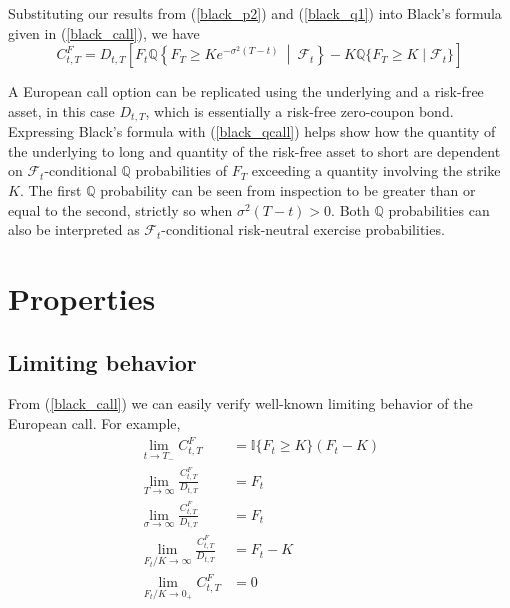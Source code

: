 \documentclass{article}
\numberwithin{equation}{section}
\begin{document}
Substituting our results from (\ref{black_p2}) and (\ref{black_q1}) into Black's
formula given in (\ref{black_call}), we have
\begin{equation} \label{black_qcall}
    C_{t, T}^F = D_{t, T}\left[F_t\mathbb{Q}\left\{F_T \ge Ke^{-\sigma^2(T - t)}
    \ \middle\vert \ \mathcal{F}_t\right\} -
    K\mathbb{Q}\{F_T \ge K \mid \mathcal{F}_t\}\right]
\end{equation}

A European call option can be replicated using the underlying and a risk-free
asset, in this case $ D_{t, T} $, which is essentially a
risk-free zero-coupon bond. Expressing Black's formula with (\ref{black_qcall})
helps show how the quantity of the underlying to long and quantity of the
risk-free asset to short are dependent on $ \mathcal{F}_t $-conditional
$ \mathbb{Q} $ probabilities of $ F_T $ exceeding a quantity involving the
strike $ K $. The first $ \mathbb{Q} $ probability can be seen from inspection
to be greater than or equal to the second, strictly so when
$ \sigma^2(T - t) > 0 $. Both $ \mathbb{Q} $ probabilities can also be
interpreted as $ \mathcal{F}_t $-conditional risk-neutral exercise
probabilities.

\section{Properties}

\subsection{Limiting behavior}

From (\ref{black_call}) we can easily verify well-known limiting behavior of
the European call. For example\footnotemark{},
\begin{equation} \label{black_limits}
    \begin{split}
        \lim_{t \rightarrow T_-}C_{t, T}^F & =
        \mathbb{I}\{F_t \ge K\}(F_t - K) \\
        \lim_{T \rightarrow \infty}\frac{C_{t, T}^F}{D_{t, T}} & = F_t \\
        \lim_{\sigma \rightarrow \infty}\frac{C_{t, T}^F}{D_{t, T}} & = F_t \\
        \lim_{F_t / K \rightarrow \infty}\frac{C_{t, T}^F}{D_{t, T}} & =
        F_t - K \\
        \lim_{F_t / K \rightarrow 0_+}C_{t, T}^F & = 0
    \end{split}
\end{equation}
\end{document}
